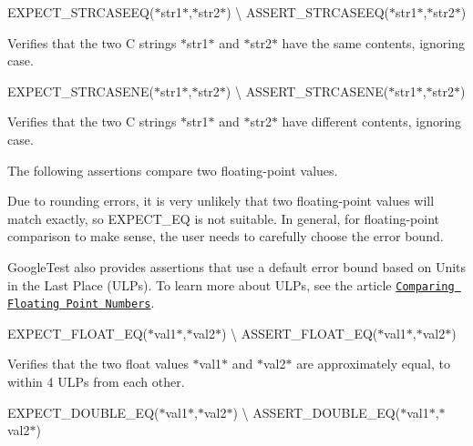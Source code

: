 {\ttfamily E\+X\+P\+E\+C\+T\+\_\+\+S\+T\+R\+C\+A\+S\+E\+EQ(}$\ast${\ttfamily str1}$\ast${\ttfamily ,}$\ast${\ttfamily str2}$\ast${\ttfamily )} \textbackslash{} {\ttfamily A\+S\+S\+E\+R\+T\+\_\+\+S\+T\+R\+C\+A\+S\+E\+EQ(}$\ast${\ttfamily str1}$\ast${\ttfamily ,}$\ast${\ttfamily str2}$\ast${\ttfamily )}

Verifies that the two C strings $\ast${\ttfamily str1}$\ast$ and $\ast${\ttfamily str2}$\ast$ have the same contents, ignoring case.

{\ttfamily E\+X\+P\+E\+C\+T\+\_\+\+S\+T\+R\+C\+A\+S\+E\+NE(}$\ast${\ttfamily str1}$\ast${\ttfamily ,}$\ast${\ttfamily str2}$\ast${\ttfamily )} \textbackslash{} {\ttfamily A\+S\+S\+E\+R\+T\+\_\+\+S\+T\+R\+C\+A\+S\+E\+NE(}$\ast${\ttfamily str1}$\ast${\ttfamily ,}$\ast${\ttfamily str2}$\ast${\ttfamily )}

Verifies that the two C strings $\ast${\ttfamily str1}$\ast$ and $\ast${\ttfamily str2}$\ast$ have different contents, ignoring case.

The following assertions compare two floating-\/point values.

Due to rounding errors, it is very unlikely that two floating-\/point values will match exactly, so {\ttfamily E\+X\+P\+E\+C\+T\+\_\+\+EQ} is not suitable. In general, for floating-\/point comparison to make sense, the user needs to carefully choose the error bound.

Google\+Test also provides assertions that use a default error bound based on Units in the Last Place (U\+L\+Ps). To learn more about U\+L\+Ps, see the article \href{https://randomascii.wordpress.com/2012/02/25/comparing-floating-point-numbers-2012-edition/}{\tt Comparing Floating Point Numbers}.

{\ttfamily E\+X\+P\+E\+C\+T\+\_\+\+F\+L\+O\+A\+T\+\_\+\+EQ(}$\ast${\ttfamily val1}$\ast${\ttfamily ,}$\ast${\ttfamily val2}$\ast${\ttfamily )} \textbackslash{} {\ttfamily A\+S\+S\+E\+R\+T\+\_\+\+F\+L\+O\+A\+T\+\_\+\+EQ(}$\ast${\ttfamily val1}$\ast${\ttfamily ,}$\ast${\ttfamily val2}$\ast${\ttfamily )}

Verifies that the two {\ttfamily float} values $\ast${\ttfamily val1}$\ast$ and $\ast${\ttfamily val2}$\ast$ are approximately equal, to within 4 U\+L\+Ps from each other.

{\ttfamily E\+X\+P\+E\+C\+T\+\_\+\+D\+O\+U\+B\+L\+E\+\_\+\+EQ(}$\ast${\ttfamily val1}$\ast${\ttfamily ,}$\ast${\ttfamily val2}$\ast${\ttfamily )} \textbackslash{} {\ttfamily A\+S\+S\+E\+R\+T\+\_\+\+D\+O\+U\+B\+L\+E\+\_\+\+EQ(}$\ast${\ttfamily val1}$\ast${\ttfamily ,}$\ast${\ttfamily val2}$\ast${\ttfamily )}

